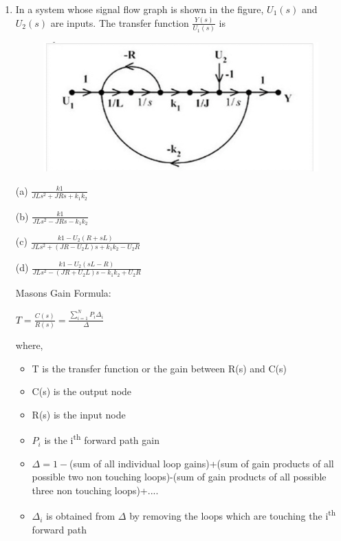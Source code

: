 \begin{enumerate}[label=\thesection.\arabic*.,ref=\thesection.\theenumi]
\item In a system whose signal flow graph is shown in the figure, $U_1(s)$ and $U_2(s)$ are inputs. The transfer function $\frac{Y(s)}{U_1(s)}$ is

\begin{figure}[!h]
  \includegraphics[width=\columnwidth]{image.jpg}
  
\end{figure}



(a) {$\frac{k1}{JLs^2+ J R s+ k_1 k_2}$}

(b) {$\frac{k1}{JLs^2- J R s- k_1 k_2}$}

(c) {$\frac{k1-U_2(R+sL)}{JLs^2+(JR-U_2L)s+ k_1 k_2-U_2 R}$}

(d) {$\frac{k1-U_2(sL-R)}{JLs^2-(JR+U_2L)s- k_1 k_2+U_2 R}$}

\solution

Masons Gain Formula:

$T=\frac{C(s)}{R(s)}=\frac{\sum_{i=1}^{N}P_i \Delta_i }{\Delta}$

where,
\begin{itemize}
    \item T is the transfer function or the gain between R(s) and C(s)
    \item C(s) is the output node
    \item R(s) is the input node
    \item $P_i$ is the i\textsuperscript{th} forward path gain
    \item $\Delta= 1 - $(sum of all individual loop gains)+(sum of gain products of all possible two non touching loops)-(sum of gain products of all possible three non touching loops)+.... 
    \item $\Delta_i$ is obtained from $\Delta$ by removing the loops which are touching the i\textsuperscript{th} forward path  
     

\end{itemize}
\end{enumerate}
